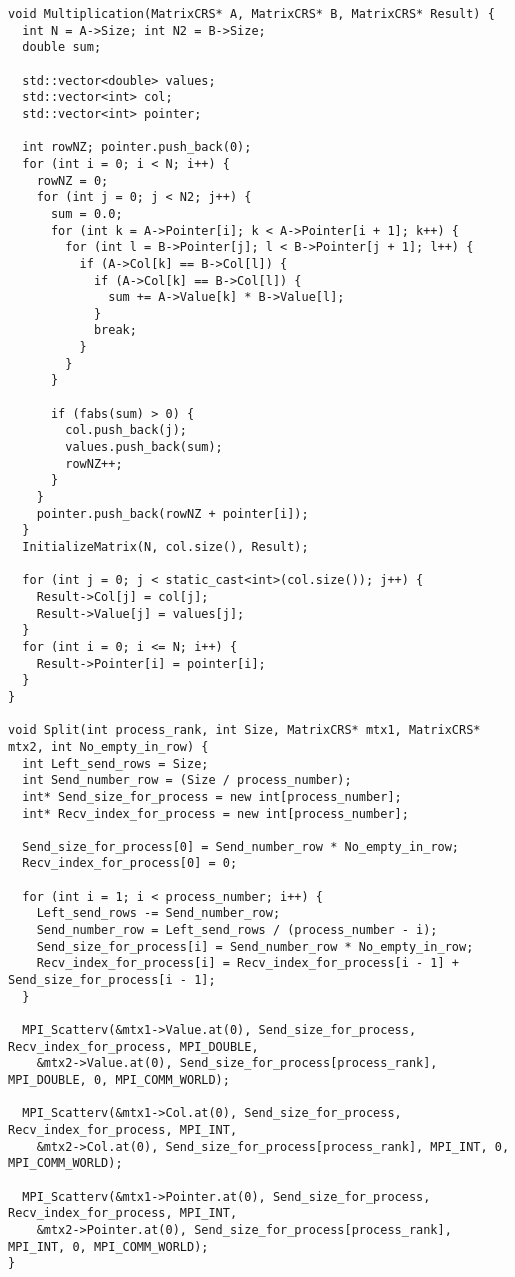 \documentclass{report}
\begin{document}
\begin{lstlisting}
void Multiplication(MatrixCRS* A, MatrixCRS* B, MatrixCRS* Result) {
  int N = A->Size; int N2 = B->Size;
  double sum;

  std::vector<double> values;
  std::vector<int> col;
  std::vector<int> pointer;

  int rowNZ; pointer.push_back(0);
  for (int i = 0; i < N; i++) {
    rowNZ = 0;
    for (int j = 0; j < N2; j++) {
      sum = 0.0;
      for (int k = A->Pointer[i]; k < A->Pointer[i + 1]; k++) {
        for (int l = B->Pointer[j]; l < B->Pointer[j + 1]; l++) {
          if (A->Col[k] == B->Col[l]) {
            if (A->Col[k] == B->Col[l]) {
              sum += A->Value[k] * B->Value[l];
            }
            break;
          }
        }
      }

      if (fabs(sum) > 0) {
        col.push_back(j);
        values.push_back(sum);
        rowNZ++;
      }
    }
    pointer.push_back(rowNZ + pointer[i]);
  }
  InitializeMatrix(N, col.size(), Result);

  for (int j = 0; j < static_cast<int>(col.size()); j++) {
    Result->Col[j] = col[j];
    Result->Value[j] = values[j];
  }
  for (int i = 0; i <= N; i++) {
    Result->Pointer[i] = pointer[i];
  }
}

void Split(int process_rank, int Size, MatrixCRS* mtx1, MatrixCRS* mtx2, int No_empty_in_row) {
  int Left_send_rows = Size;
  int Send_number_row = (Size / process_number);
  int* Send_size_for_process = new int[process_number];
  int* Recv_index_for_process = new int[process_number];

  Send_size_for_process[0] = Send_number_row * No_empty_in_row;
  Recv_index_for_process[0] = 0;

  for (int i = 1; i < process_number; i++) {
    Left_send_rows -= Send_number_row;
    Send_number_row = Left_send_rows / (process_number - i);
    Send_size_for_process[i] = Send_number_row * No_empty_in_row;
    Recv_index_for_process[i] = Recv_index_for_process[i - 1] + Send_size_for_process[i - 1];
  }

  MPI_Scatterv(&mtx1->Value.at(0), Send_size_for_process, Recv_index_for_process, MPI_DOUBLE,
    &mtx2->Value.at(0), Send_size_for_process[process_rank], MPI_DOUBLE, 0, MPI_COMM_WORLD);

  MPI_Scatterv(&mtx1->Col.at(0), Send_size_for_process, Recv_index_for_process, MPI_INT,
    &mtx2->Col.at(0), Send_size_for_process[process_rank], MPI_INT, 0, MPI_COMM_WORLD);

  MPI_Scatterv(&mtx1->Pointer.at(0), Send_size_for_process, Recv_index_for_process, MPI_INT,
    &mtx2->Pointer.at(0), Send_size_for_process[process_rank], MPI_INT, 0, MPI_COMM_WORLD);
}


\end{lstlisting}
\end{document}
